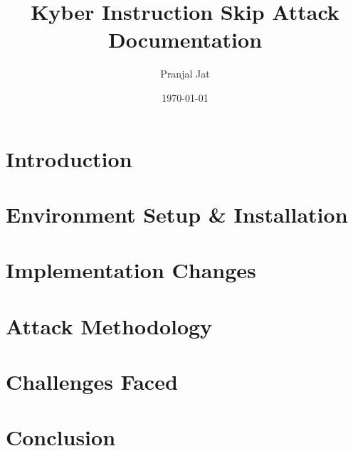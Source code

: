 \documentclass[a4paper,12pt]{report}
\title{\textbf{Kyber Instruction Skip Attack}\\Documentation}
\author{Pranjal Jat}
\date{\today}
\begin{document}
\maketitle
\tableofcontents

\chapter{Introduction}


\chapter{Environment Setup \& Installation}


\chapter{Implementation Changes}


\chapter{Attack Methodology}


\chapter{Challenges Faced}


\chapter{Conclusion}

\end{document}
